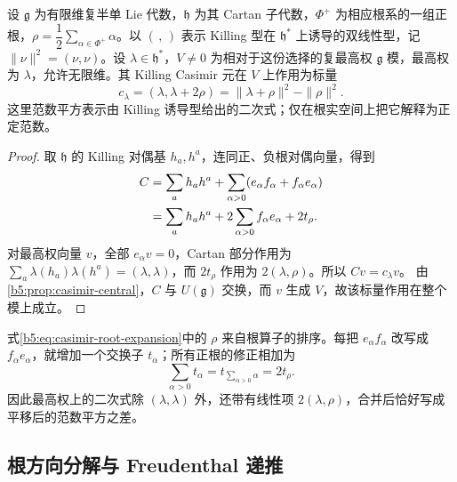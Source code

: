 \begin{proposition}\label{b5:prop:casimir-highest-scalar}
	设 \(\mathfrak g\) 为有限维复半单 Lie 代数，\(\mathfrak h\) 为其 Cartan 子代数，\(\Phi^+\) 为相应根系的一组正根，\(\rho=\dfrac12\sum_{\alpha\in\Phi^+}\alpha\)。以 \((\, ,\,)\) 表示 Killing 型在 \(\mathfrak h^*\) 上诱导的双线性型，记 \(\|\nu\|^2=(\nu,\nu)\)。设 \(\lambda\in\mathfrak h^*\)，\(V\ne0\) 为相对于这份选择的复最高权 \(\mathfrak g\) 模，最高权为 \(\lambda\)，允许无限维。其 Killing Casimir 元在 \(V\) 上作用为标量
	\begin{equation}\label{b5:eq:casimir-highest-scalar}
		c_\lambda=(\lambda,\lambda+2\rho) =\|\lambda+\rho\|^2-\|\rho\|^2.
	\end{equation}
	这里范数平方表示由 Killing 诱导型给出的二次式；仅在根实空间上把它解释为正定范数。
\end{proposition}
\begin{proof}
	取 \(\mathfrak h\) 的 Killing 对偶基 \(h_a,h^a\)，连同正、负根对偶向量，得到
	\begin{align}
		C &=\sum_a h_a h^a+\sum_{\alpha>0} (e_\alpha f_\alpha+f_\alpha e_\alpha)\notag\\
		&=\sum_a h_a h^a+2\sum_{\alpha>0}f_\alpha e_\alpha+2t_\rho.
		\label{b5:eq:casimir-root-expansion}
	\end{align}
	对最高权向量 \(v\)，全部 \(e_\alpha v=0\)，Cartan 部分作用为 \(\sum_a\lambda(h_a)\lambda(h^a)=(\lambda,\lambda)\)，而 \(2t_\rho\) 作用为 \(2(\lambda,\rho)\)。所以 \(Cv=c_\lambda v\)。 由\cref{b5:prop:casimir-central}，\(C\) 与 \(U(\mathfrak g)\) 交换，而 \(v\) 生成 \(V\)，故该标量作用在整个模上成立。
\end{proof}

式\eqref{b5:eq:casimir-root-expansion}中的 \(\rho\) 来自根算子的排序。每把 \(e_\alpha f_\alpha\) 改写成 \(f_\alpha e_\alpha\)，就增加一个交换子 \(t_\alpha\)；所有正根的修正相加为
\[
	\sum_{\alpha>0}t_\alpha =t_{\sum_{\alpha>0}\alpha}=2t_\rho.
\]
因此最高权上的二次式除 \((\lambda,\lambda)\) 外，还带有线性项 \(2(\lambda,\rho)\)，合并后恰好写成平移后的范数平方之差。

\subsection{根方向分解与 Freudenthal 递推}
\label{b5:subsec:1902:02}

